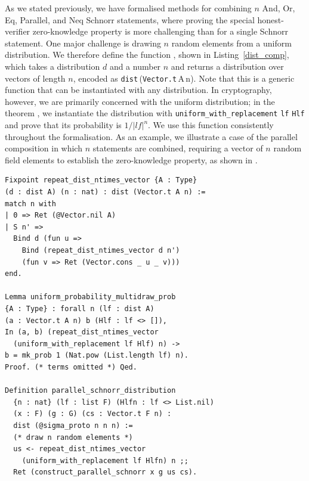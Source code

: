 \documentclass[sigconf,anonymous,review]{acmart}
\begin{document}
As we stated previously, we have formalised methods for combining $n$ And, Or, Eq, Parallel, and Neq Schnorr statements, where proving the special honest-verifier zero-knowledge property is more challenging than for a single Schnorr statement. One major challenge is drawing $n$ random elements from a uniform distribution. We therefore define the function \texttt{}, shown in Listing~\ref{dist_comp}, which takes a distribution $d$ and a number $n$ and returns a distribution over vectors of length $n$, encoded as \texttt{dist}\,(\texttt{Vector.t}\,A\,n). Note that this is a generic function that can be instantiated with any distribution. In cryptography, however, we are primarily concerned with the uniform distribution; in the theorem \texttt{}, we instantiate the distribution with \texttt{uniform\_with\_replacement} \texttt{lf} \texttt{Hlf} and prove that its probability is $1/|lf|^n$. We use this function consistently throughout the formalisation. As an example, we illustrate a case of the parallel composition in which $n$ statements are combined, requiring a vector of $n$ random field elements to establish the zero-knowledge property, as shown in \texttt{}.


\begin{lstlisting}[frame=single, language=Coq, caption={Composition of a Distribution},
label={dist_comp},captionpos=t, basicstyle=\ttfamily\footnotesize,
abovecaptionskip=-\medskipamount]
Fixpoint repeat_dist_ntimes_vector {A : Type} 
(d : dist A) (n : nat) : dist (Vector.t A n) := 
match n with 
| 0 => Ret (@Vector.nil A)
| S n' => 
  Bind d (fun u => 
    Bind (repeat_dist_ntimes_vector d n')
    (fun v => Ret (Vector.cons _ u _ v)))
end.

Lemma uniform_probability_multidraw_prob 
{A : Type} : forall n (lf : dist A) 
(a : Vector.t A n) b (Hlf : lf <> []), 
In (a, b) (repeat_dist_ntimes_vector 
  (uniform_with_replacement lf Hlf) n) ->
b = mk_prob 1 (Nat.pow (List.length lf) n).
Proof. (* terms omitted *) Qed.

Definition parallel_schnorr_distribution  
  {n : nat} (lf : list F) (Hlfn : lf <> List.nil) 
  (x : F) (g : G) (cs : Vector.t F n) : 
  dist (@sigma_proto n n n) :=
  (* draw n random elements *)
  us <- repeat_dist_ntimes_vector 
    (uniform_with_replacement lf Hlfn) n ;;
  Ret (construct_parallel_schnorr x g us cs).
\end{lstlisting}
\end{document}
